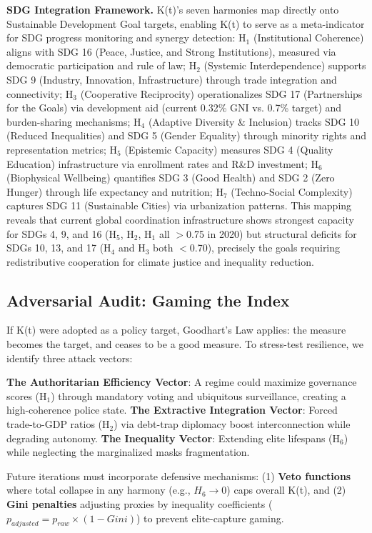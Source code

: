 \documentclass[11pt,letterpaper]{article}
\begin{document}
\textbf{SDG Integration Framework.} K(t)'s seven harmonies map directly onto Sustainable Development Goal targets, enabling K(t) to serve as a meta-indicator for SDG progress monitoring and synergy detection: H$_1$ (Institutional Coherence) aligns with SDG 16 (Peace, Justice, and Strong Institutions), measured via democratic participation and rule of law; H$_2$ (Systemic Interdependence) supports SDG 9 (Industry, Innovation, Infrastructure) through trade integration and connectivity; H$_3$ (Cooperative Reciprocity) operationalizes SDG 17 (Partnerships for the Goals) via development aid (current 0.32\% GNI vs. 0.7\% target) and burden-sharing mechanisms; H$_4$ (Adaptive Diversity \& Inclusion) tracks SDG 10 (Reduced Inequalities) and SDG 5 (Gender Equality) through minority rights and representation metrics; H$_5$ (Epistemic Capacity) measures SDG 4 (Quality Education) infrastructure via enrollment rates and R\&D investment; H$_6$ (Biophysical Wellbeing) quantifies SDG 3 (Good Health) and SDG 2 (Zero Hunger) through life expectancy and nutrition; H$_7$ (Techno-Social Complexity) captures SDG 11 (Sustainable Cities) via urbanization patterns. This mapping reveals that current global coordination infrastructure shows strongest capacity for SDGs 4, 9, and 16 (H$_5$, H$_2$, H$_1$ all $>$0.75 in 2020) but structural deficits for SDGs 10, 13, and 17 (H$_4$ and H$_3$ both $<$0.70), precisely the goals requiring redistributive cooperation for climate justice and inequality reduction.

\subsection{Adversarial Audit: Gaming the Index}
\label{sec:adversarial-audit}

If K(t) were adopted as a policy target, Goodhart's Law applies: the measure becomes the target, and ceases to be a good measure. To stress-test resilience, we identify three attack vectors:

\textbf{The Authoritarian Efficiency Vector}: A regime could maximize governance scores (H$_1$) through mandatory voting and ubiquitous surveillance, creating a high-coherence police state. \textbf{The Extractive Integration Vector}: Forced trade-to-GDP ratios (H$_2$) via debt-trap diplomacy boost interconnection while degrading autonomy. \textbf{The Inequality Vector}: Extending elite lifespans (H$_6$) while neglecting the marginalized masks fragmentation.

Future iterations must incorporate defensive mechanisms: (1) \textbf{Veto functions} where total collapse in any harmony (e.g., $H_6 \to 0$) caps overall K(t), and (2) \textbf{Gini penalties} adjusting proxies by inequality coefficients ($p_{adjusted} = p_{raw} \times (1 - Gini)$) to prevent elite-capture gaming.
\end{document}
